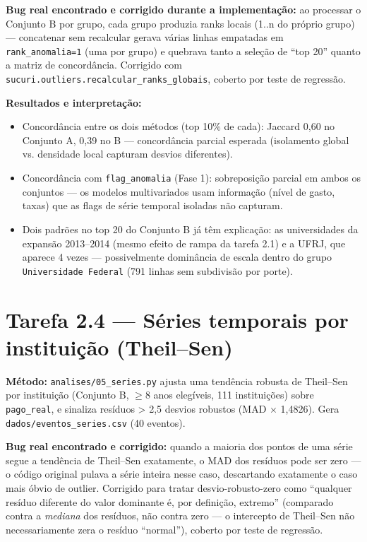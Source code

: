 \documentclass[11pt,a4paper]{article}
\begin{document}
\textbf{Bug real encontrado e corrigido durante a implementação:} ao
processar o Conjunto B por grupo, cada grupo produzia ranks locais (1..n
do próprio grupo) --- concatenar sem recalcular gerava várias linhas
empatadas em \texttt{rank\_anomalia=1} (uma por grupo) e quebrava tanto a
seleção de ``top 20'' quanto a matriz de concordância. Corrigido com
\texttt{sucuri.outliers.recalcular\_ranks\_globais}, coberto por teste de
regressão.

\textbf{Resultados e interpretação:}

\begin{itemize}
    \item Concordância entre os dois métodos (top 10\% de cada): Jaccard
    0,60 no Conjunto A, 0,39 no B --- concordância parcial esperada
    (isolamento global vs. densidade local capturam desvios diferentes).
    \item Concordância com \texttt{flag\_anomalia} (Fase 1): sobreposição
    parcial em ambos os conjuntos --- os modelos multivariados usam
    informação (nível de gasto, taxas) que as flags de série temporal
    isoladas não capturam.
    \item Dois padrões no top 20 do Conjunto B já têm explicação: as
    universidades da expansão 2013--2014 (mesmo efeito de rampa da tarefa
    2.1) e a UFRJ, que aparece 4 vezes --- possivelmente dominância de
    escala dentro do grupo \texttt{Universidade Federal} (791 linhas sem
    subdivisão por porte).
\end{itemize}

\section{Tarefa 2.4 --- Séries temporais por instituição (Theil--Sen)}

\textbf{Método:} \texttt{analises/05\_series.py} ajusta uma tendência
robusta de Theil--Sen por instituição (Conjunto B, $\geq$8 anos elegíveis, 111
instituições) sobre \texttt{pago\_real}, e sinaliza resíduos > 2,5
desvios robustos (MAD $\times$ 1,4826). Gera \texttt{dados/eventos\_series.csv}
(40 eventos).

\textbf{Bug real encontrado e corrigido:} quando a maioria dos pontos de
uma série segue a tendência de Theil--Sen exatamente, o MAD dos resíduos
pode ser zero --- o código original pulava a série inteira nesse caso,
descartando exatamente o caso mais óbvio de outlier. Corrigido para tratar
desvio-robusto-zero como ``qualquer resíduo diferente do valor dominante é,
por definição, extremo'' (comparado contra a \emph{mediana} dos resíduos,
não contra zero --- o intercepto de Theil--Sen não necessariamente zera o
resíduo ``normal''), coberto por teste de regressão.
\end{document}
